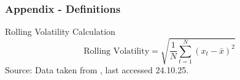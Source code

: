 \begin{frame}
	\frametitle{Appendix - Definitions}
    \begin{block}{Rolling Volatility Calculation}
        \begin{equation}
            \text{Rolling Volatility} = \sqrt{\frac{1}{N} \sum_{t=1}^{N} (x_t - \bar{x})^2}
        \end{equation}
        \footnotesize{Source: Data taken from \cite{fred_2025_federal_reserve_data}, last accessed 24.10.25.}
    \end{block}
\end{frame}
